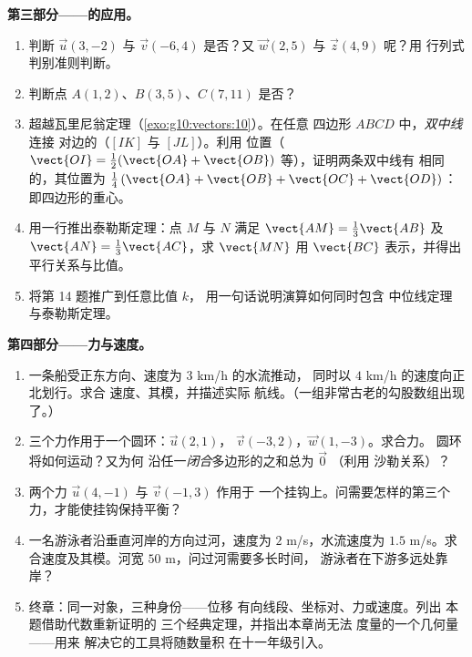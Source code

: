 \begin{problem}
\medskip
\noindent\textbf{第三部分——的应用。}
\begin{enumerate}[resume]
  \item 判断 $\vec u(3, -2)$ 与 $\vec v(-6, 4)$ 是否？又
        $\vec w(2, 5)$ 与 $\vec z(4, 9)$ 呢？用
        行列式判别准则判断。
  \item 判断点 $A(1, 2)$、$B(3, 5)$、$C(7, 11)$
        是否？
  \item 超越瓦里尼翁定理（\cref{exo:g10:vectors:10}）。在任意
        四边形 $ABCD$ 中，\emph{双中线}连接
        对边的（$[IK]$ 与 $[JL]$）。利用
        位置（$\vect{OI} = \frac12(\vect{OA} +
        \vect{OB})$ 等），证明两条双中线有
        相同的，其位置为
        $\frac14\left(\vect{OA} + \vect{OB} + \vect{OC} +
        \vect{OD}\right)$：即四边形的重心。
  \item 用一行推出泰勒斯定理：点 $M$ 与 $N$ 满足
        $\vect{AM} = \frac13\vect{AB}$ 及
        $\vect{AN} = \frac13\vect{AC}$，求
        $\vect{MN}$ 用 $\vect{BC}$ 表示，并得出
        平行关系与比值。
  \item 将第 14 题推广到任意比值 $k$，
        用一句话说明演算如何同时包含
        中位线定理
        与泰勒斯定理。
\end{enumerate}

\medskip
\noindent\textbf{第四部分——力与速度。}
\begin{enumerate}[resume]
  \item 一条船受正东方向、速度为 $3$ km/h 的水流推动，
        同时以 $4$ km/h 的速度向正北划行。求合
        速度、其模，并描述实际
        航线。（一组非常古老的勾股数组出现了。）
  \item 三个力作用于一个圆环：$\vec u(2, 1)$，
        $\vec v(-3, 2)$，$\vec w(1, -3)$。求合力。
        圆环将如何运动？又为何
        沿任一\emph{闭合}多边形的之和总为 $\vec 0$
        （利用 沙勒关系）？
  \item 两个力 $\vec u(4, -1)$ 与 $\vec v(-1, 3)$ 作用于
        一个挂钩上。问需要怎样的第三个力，才能使挂钩保持平衡？
  \item 一名游泳者沿垂直河岸的方向过河，速度为
        $2$ m/s，水流速度为 $1.5$ m/s。求
        合速度及其模。河宽
        $50$ m，问过河需要多长时间，
        游泳者在下游多远处靠岸？
  \item 终章：同一对象，三种身份——位移
        有向线段、坐标对、力或速度。列出
        本题借助代数重新证明的
        三个经典定理，并指出本章尚无法
        度量的一个几何量——用来
        解决它的工具将随数量积
        在十一年级引入。
\end{enumerate}
\end{problem}
